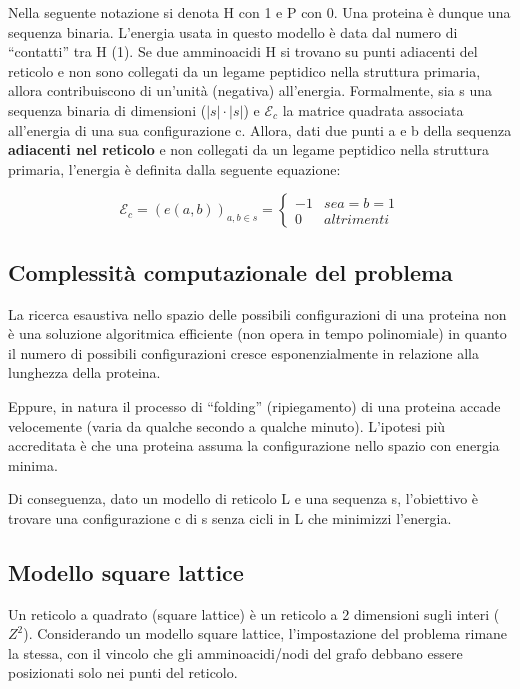 \documentclass[conference]{IEEEtran}
\begin{document}
Nella seguente notazione si denota H con 1 e P con 0. Una proteina è dunque una sequenza binaria. L'energia usata in questo modello è data dal numero di ``contatti'' tra H (1). Se due amminoacidi H si trovano su punti adiacenti del reticolo e non sono collegati da un legame peptidico nella struttura primaria, allora contribuiscono di un'unità (negativa) all'energia.
Formalmente, sia s una sequenza binaria di dimensioni ($|s|\cdot|s|$) e $\mathcal{E}_c$ la matrice quadrata associata all'energia di una sua configurazione c. Allora, dati due punti a e b della sequenza \textbf{adiacenti nel reticolo} e non collegati da un legame peptidico nella struttura primaria, l'energia è definita dalla seguente equazione:

\begin{equation}
    \mathcal{E}_c = (e(a,b))_{a,b \in s} =
    \begin{cases*}
      -1 & se a = b = 1 \\
      0  & altrimenti
    \end{cases*}
\end{equation}

\subsection{Complessità computazionale del problema}

La ricerca esaustiva nello spazio delle possibili configurazioni di una proteina non è una soluzione algoritmica efficiente (non opera in tempo polinomiale) in quanto il numero di possibili configurazioni cresce esponenzialmente in relazione alla lunghezza della proteina.

Eppure, in natura il processo di ``folding'' (ripiegamento) di una proteina accade velocemente (varia da qualche secondo a qualche minuto). L'ipotesi più accreditata è che una proteina assuma la configurazione nello spazio con energia minima.

Di conseguenza, dato un modello di reticolo L e una sequenza s, l'obiettivo è trovare una configurazione c di s senza cicli in L che minimizzi l'energia.

\subsection{Modello square lattice}

Un reticolo a quadrato (square lattice) è un reticolo a 2 dimensioni sugli interi ($Z^2$). Considerando un modello square lattice, l'impostazione del problema rimane la stessa, con il vincolo che gli amminoacidi/nodi del grafo debbano essere posizionati solo nei punti del reticolo.
\end{document}
